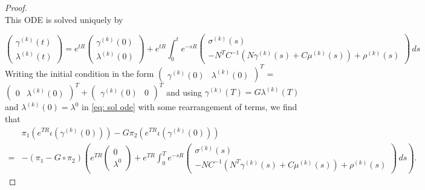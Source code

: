 \documentclass[11pt]{article}
\begin{document}
\begin{proof}
\begin{equation}
\end{equation}
This ODE is solved uniquely by 

\begin{equation} 
\begin{pmatrix} \gamma^{(k)}(t) \\ \lambda^{(k)}(t) \end{pmatrix} = e^{tR} \begin{pmatrix} \gamma^{(k)}(0) \\ \lambda^{(k)}(0) \end{pmatrix} + e^{tR} \int_0^t e^{-sR} \begin{pmatrix} \sigma^{(k)}(s) \\ - N^TC^{-1} ( N \gamma^{(k)}(s) + C\mu^{(k)}(s)) + \rho^{(k)}(s) \end{pmatrix} \, ds \label{eq: sol ode}
\end{equation}
Writing the initial condition in the form $\begin{pmatrix} \gamma^{(k)}(0)& \lambda^{(k)}(0)\end{pmatrix}^T$ = $\begin{pmatrix} 0 & \lambda^{(k)}(0)\end{pmatrix}^T + \begin{pmatrix} \gamma^{(k)}(0) & 0\end{pmatrix}^T$ and using $\gamma^{(k)}(T) = G \lambda^{(k)}(T)$ and $\lambda^{(k)}(0) = \lambda^0$ in \eqref{eq: sol ode} with some rearrangement of terms, we find that
\begin{equation}
\begin{aligned}
&    \pi_1 (e^{TR} \iota (\gamma^{(k)}(0))) - G \pi_2 (e^{TR} \iota(\gamma^{(k)}(0))) \\ 
= & - (\pi_1 - G \circ \pi_2) \left( e^{TR} \begin{pmatrix} 0 \\ \lambda^0 \end{pmatrix} + e^{TR} \int_0^T e^{-sR} \begin{pmatrix} \sigma^{(k)}(s) \\ - N C^{-1} ( N^T\gamma^{(k)}(s) + C\mu^{(k)}(s)) + \rho^{(k)}(s) \end{pmatrix} \, ds \right).  

\end{aligned}
\end{equation}
\end{proof}
\end{document}
